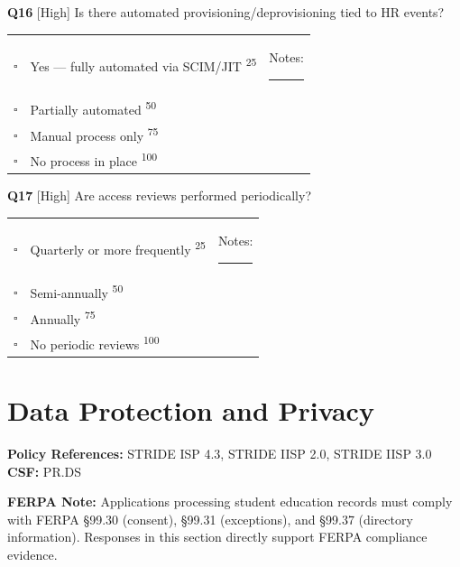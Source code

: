 \documentclass[11pt,landscape]{article}
\newcommand{\ferpabox}[1]{\colorbox{ferpabox}{\parbox{0.95\textwidth}{\small\textbf{FERPA Note:} #1}}}
\begin{document}
\vspace{0.3cm}

\noindent\colorbox{highbg}{\textbf{Q16} [High]} Is there automated provisioning/deprovisioning tied to HR events?

\begin{tabularx}{\textwidth}{cXX}
$\square$ & Yes --- fully automated via SCIM/JIT \textsuperscript{\scriptsize\textcolor{stridegray}{25}} & Notes: \rule{4cm}{0.4pt} \\
$\square$ & Partially automated \textsuperscript{\scriptsize\textcolor{stridegray}{50}} &  \\
$\square$ & Manual process only \textsuperscript{\scriptsize\textcolor{stridegray}{75}} &  \\
$\square$ & No process in place \textsuperscript{\scriptsize\textcolor{stridegray}{100}} &  \\
\end{tabularx}

\vspace{0.3cm}

\noindent\colorbox{highbg}{\textbf{Q17} [High]} Are access reviews performed periodically?

\begin{tabularx}{\textwidth}{cXX}
$\square$ & Quarterly or more frequently \textsuperscript{\scriptsize\textcolor{stridegray}{25}} & Notes: \rule{4cm}{0.4pt} \\
$\square$ & Semi-annually \textsuperscript{\scriptsize\textcolor{stridegray}{50}} &  \\
$\square$ & Annually \textsuperscript{\scriptsize\textcolor{stridegray}{75}} &  \\
$\square$ & No periodic reviews \textsuperscript{\scriptsize\textcolor{stridegray}{100}} &  \\
\end{tabularx}

\vspace{0.3cm}

\newpage

\section{Data Protection and Privacy}

\textbf{Policy References:} STRIDE ISP 4.3, STRIDE IISP 2.0, STRIDE IISP 3.0 \hfill \textbf{CSF:} PR.DS

\ferpabox{Applications processing student education records must comply with FERPA §99.30 (consent), §99.31 (exceptions), and §99.37 (directory information). Responses in this section directly support FERPA compliance evidence.}
\end{document}
